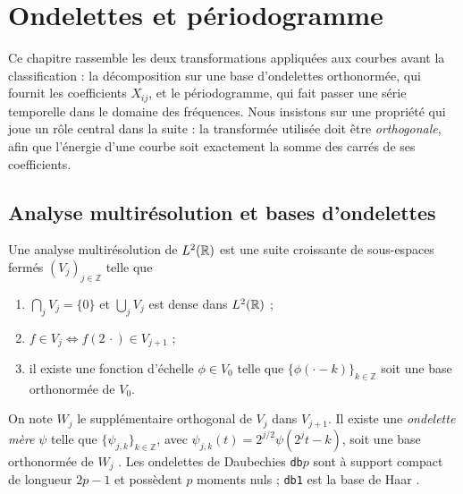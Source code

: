 \chapter{Ondelettes et périodogramme}\label{chap-ondelettes}

Ce chapitre rassemble les deux transformations appliquées aux courbes avant la classification : la décomposition sur une base d'ondelettes orthonormée, qui fournit les coefficients $X_{ij}$, et le périodogramme, qui fait passer une série temporelle dans le domaine des fréquences. Nous insistons sur une propriété qui joue un rôle central dans la suite : la transformée utilisée doit être \emph{orthogonale}, afin que l'énergie d'une courbe soit exactement la somme des carrés de ses coefficients.

\section{Analyse multirésolution et bases d'ondelettes}\label{sec-amr}

\begin{definition}
Une analyse multirésolution de $L^2(\mathbb{R})$ est une suite croissante de sous-espaces fermés $(V_j)_{j\in\mathbb{Z}}$ telle que
\begin{enumerate}[label=(\roman*)]
  \item $\bigcap_j V_j=\{0\}$ et $\bigcup_j V_j$ est dense dans $L^2(\mathbb{R})$ ;
  \item $f\in V_j\iff f(2\,\cdot)\in V_{j+1}$ ;
  \item il existe une fonction d'échelle $\phi\in V_0$ telle que $\{\phi(\cdot-k)\}_{k\in\mathbb{Z}}$ soit une base orthonormée de $V_0$.
\end{enumerate}
\end{definition}

On note $W_j$ le supplémentaire orthogonal de $V_j$ dans $V_{j+1}$. Il existe une \emph{ondelette mère} $\psi$ telle que $\{\psi_{j,k}\}_{k\in\mathbb{Z}}$, avec $\psi_{j,k}(t)=2^{j/2}\psi(2^jt-k)$, soit une base orthonormée de $W_j$ \citep{mallat1989theory,daubechies1992ten}. Les ondelettes de Daubechies \texttt{db}$p$ sont à support compact de longueur $2p-1$ et possèdent $p$ moments nuls ; \texttt{db1} est la base de Haar \citep{haar1910theorie}.

